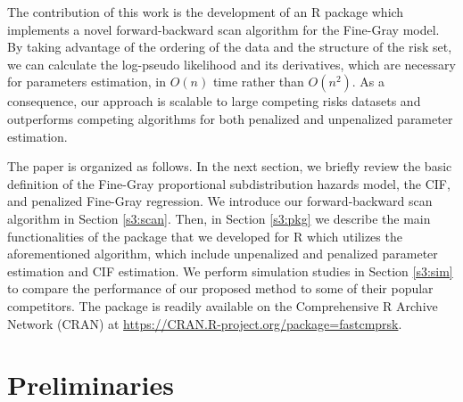 The contribution of this work is the development of an {R} package  \citep{fastcmprsk}  which implements a novel forward-backward scan algorithm \citep{kawaguchi2019scalable} for the Fine-Gray model. By taking advantage of the ordering of the data and the structure of the risk set, we can calculate the log-pseudo likelihood and its derivatives, which are necessary for parameters estimation, in $O(n)$ time rather than $O(n^2)$. As a consequence, our approach is scalable to large competing risks datasets and outperforms competing algorithms for both penalized and unpenalized parameter estimation. 

The paper is organized as follows. In the next section, we briefly review the basic definition of the Fine-Gray proportional subdistribution hazards model, the CIF, and penalized Fine-Gray regression. We introduce our forward-backward scan algorithm in Section \ref{s3:scan}. Then, in Section \ref{s3:pkg} we describe the main functionalities of the  package that we developed for {R} which utilizes the aforementioned algorithm, which include unpenalized and penalized parameter estimation and CIF estimation. We perform simulation studies in Section \ref{s3:sim} to compare the performance of our proposed method to some of their popular competitors. The  package is readily available on the Comprehensive R Archive Network (CRAN) at \url{https://CRAN.R-project.org/package=fastcmprsk}.


\section{Preliminaries}
